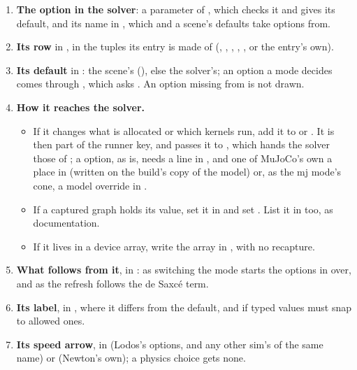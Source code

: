 \begin{enumerate}
\item \textbf{The option in the solver}: a parameter of , which checks it and gives its default, and its name in , which  and a scene's defaults take options from.
\item \textbf{Its row} in , in the tuples its entry is made of (, , , , , or the entry's own).
\item \textbf{Its default} in : the scene's (), else the solver's; an option a mode decides comes through , which asks . An option missing from  is not drawn.
\item \textbf{How it reaches the solver.}
  \begin{itemize}
  \item If it changes what is allocated or which kernels run, add it to  or . It is then part of the runner key, and  passes it to , which hands the solver those of ; a  option, as  is, needs a line in , and one of MuJoCo's own a place in  (written on the build's copy of the model) or, as the mj mode's cone, a model override in .
  \item If a captured graph holds its value, set it in  and set . List it in  too, as documentation.
  \item If it lives in a device array, write the array in , with no recapture.
  \end{itemize}
\item \textbf{What follows from it}, in : as switching the mode starts the options in  over, and as the refresh follows the de Saxcé term.
\item \textbf{Its label}, in , where it differs from the default, and  if typed values must snap to allowed ones.
\item \textbf{Its speed arrow}, in  (Lodos's options, and any other sim's of the same name) or  (Newton's own); a physics choice gets none.
\end{enumerate}

